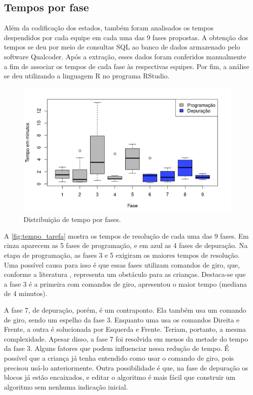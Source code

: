  \subsection{Tempos por fase}

Além da codificação dos estados, também foram analisados os tempos despendidos por cada equipe em cada uma das 9 fases propostas. A obtenção dos tempos se deu por meio de consultas SQL ao banco de dados armazenado pelo software Qualcoder. Após a extração, esses dados foram conferidos manualmente a fim de associar os tempos de cada fase às respectivas equipes. Por fim, a análise se deu utilizando a linguagem R no programa RStudio. 

 \begin{figure}[!htpb]
    \centering
    \includegraphics[width=.6\linewidth,fbox]{figs/tempos_por_tarefa.png}
    \caption{Distribuição de tempo por fases.}
    \sourceauthor
    \label{fig:tempo_tarefa}
\end{figure}

A \autoref{fig:tempo_tarefa} mostra os tempos de resolução de cada uma das 9 fases. Em cinza aparecem as 5 fases de programação, e em azul as 4 fases de depuração. Na etapa de programação, as fases 3 e 5 exigiram os maiores tempos de resolução. Uma possível causa para isso é que essas fases utilizam comandos de giro, que, conforme a literatura \cite{piaget_development_1964},  representa um obstáculo para as crianças. Destaca-se que a fase 3 é a primeira com comandos de giro, apresentou o maior tempo (mediana de 4 minutos).

A fase 7, de depuração, porém, é um contraponto. Ela também usa um comando de giro, sendo um espelho da fase 3. Enquanto uma usa os comandos Direita e Frente, a outra é solucionada por Esquerda e Frente. Teriam, portanto, a mesma complexidade. Apesar disso, a fase 7 foi resolvida em menos da metade do tempo da fase 3. Alguns fatores que podem influenciar nessa redução de tempo. É possível que a criança já tenha entendido como usar o comando de giro, pois precisou usá-lo anteriormente. Outra possibilidade é que, na fase de depuração os blocos já estão encaixados, e editar o algoritmo é mais fácil que construir um algoritmo sem nenhuma indicação inicial. 

